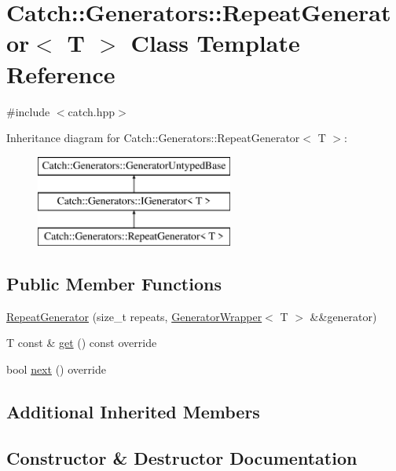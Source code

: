 \hypertarget{class_catch_1_1_generators_1_1_repeat_generator}{}\section{Catch\+:\+:Generators\+:\+:Repeat\+Generator$<$ T $>$ Class Template Reference}
\label{class_catch_1_1_generators_1_1_repeat_generator}


{\ttfamily \#include $<$catch.\+hpp$>$}

Inheritance diagram for Catch\+:\+:Generators\+:\+:Repeat\+Generator$<$ T $>$\+:\begin{figure}[H]
\begin{center}
\leavevmode
\includegraphics[height=3.000000cm]{class_catch_1_1_generators_1_1_repeat_generator}
\end{center}
\end{figure}
\subsection*{Public Member Functions}
\begin{DoxyCompactItemize}
\item 
\mbox{\hyperlink{class_catch_1_1_generators_1_1_repeat_generator_a3aee12c4f9c2c04823ca3c75a20f234f}{Repeat\+Generator}} (size\+\_\+t repeats, \mbox{\hyperlink{class_catch_1_1_generators_1_1_generator_wrapper}{Generator\+Wrapper}}$<$ T $>$ \&\&generator)
\item 
T const  \& \mbox{\hyperlink{class_catch_1_1_generators_1_1_repeat_generator_a43bd573274c9a0cd7f4406a3d0d36d49}{get}} () const override
\item 
bool \mbox{\hyperlink{class_catch_1_1_generators_1_1_repeat_generator_a24d5c2b1c09d6d220d4bd4c83f222dcb}{next}} () override
\end{DoxyCompactItemize}
\subsection*{Additional Inherited Members}


\subsection{Constructor \& Destructor Documentation}
\mbox{\label{class_catch_1_1_generators_1_1_repeat_generator_a3aee12c4f9c2c04823ca3c75a20f234f}} 
